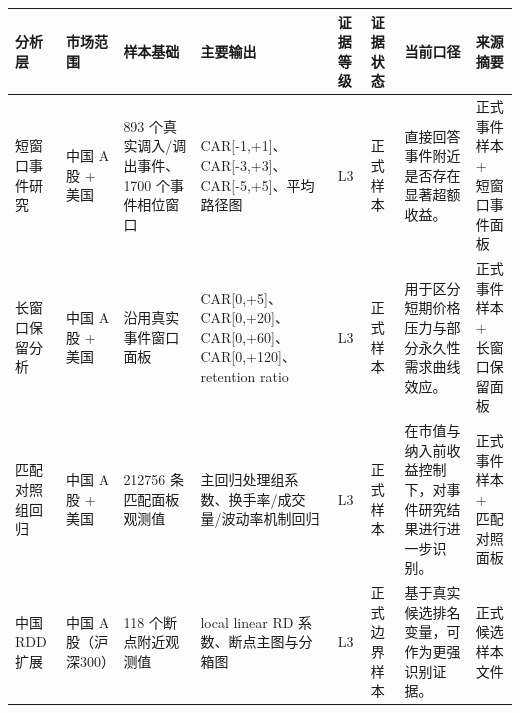 \begin{tabular}{llllllll}
\toprule
分析层 & 市场范围 & 样本基础 & 主要输出 & 证据等级 & 证据状态 & 当前口径 & 来源摘要 \\
\midrule
短窗口事件研究 & 中国 A 股 + 美国 & 893 个真实调入/调出事件、1700 个事件相位窗口 & CAR[-1,+1]、CAR[-3,+3]、CAR[-5,+5]、平均路径图 & L3 & 正式样本 & 直接回答事件附近是否存在显著超额收益。 & 正式事件样本 + 短窗口事件面板 \\
长窗口保留分析 & 中国 A 股 + 美国 & 沿用真实事件窗口面板 & CAR[0,+5]、CAR[0,+20]、CAR[0,+60]、CAR[0,+120]、retention ratio & L3 & 正式样本 & 用于区分短期价格压力与部分永久性需求曲线效应。 & 正式事件样本 + 长窗口保留面板 \\
匹配对照组回归 & 中国 A 股 + 美国 & 212756 条匹配面板观测值 & 主回归处理组系数、换手率/成交量/波动率机制回归 & L3 & 正式样本 & 在市值与纳入前收益控制下，对事件研究结果进行进一步识别。 & 正式事件样本 + 匹配对照面板 \\
中国 RDD 扩展 & 中国 A 股（沪深300） & 118 个断点附近观测值 & local linear RD 系数、断点主图与分箱图 & L3 & 正式边界样本 & 基于真实候选排名变量，可作为更强识别证据。 & 正式候选样本文件 \\
\bottomrule
\end{tabular}
